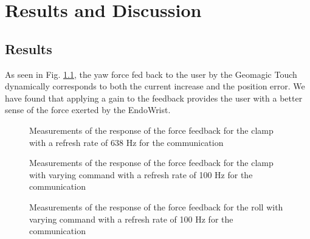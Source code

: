 \chapter{Results and Discussion}\label{cha:discussion}





\section{Results}




As seen in Fig. \ref{fig:fbkm}, the yaw force fed back to the user by the Geomagic Touch dynamically corresponds to both the current increase and the position error.
We have found that applying a gain to the feedback provides the user with a better sense of the force exerted by the EndoWrist.

\begin{figure}[h]\label{fig:fbkm}
  
  \caption{Measurements of the response of the force feedback for the clamp with a refresh rate of 638 Hz for the communication}
\end{figure}

\begin{figure}[h]\label{fig:fbkm_100}
  
  \caption{Measurements of the response of the force feedback for the clamp with varying command with a refresh rate of 100 Hz for the communication}
\end{figure}



\begin{figure}[h]\label{fig:fbkm_100}
  
  \caption{Measurements of the response of the force feedback for the roll with varying command with a refresh rate of 100 Hz for the communication}
\end{figure}



